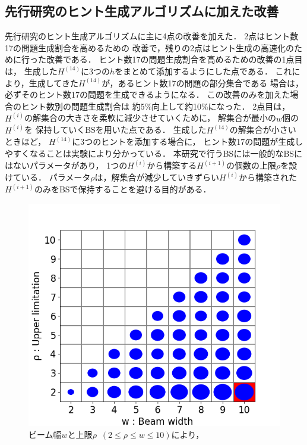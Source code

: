 \documentclass[a4paper, 9pt]{jarticle}
\begin{document}
\begin{論文概要}
\section{先行研究のヒント生成アルゴリズムに加えた改善}
先行研究のヒント生成アルゴリズムに主に4点の改善を加えた．
2点はヒント数17の問題生成割合を高めるための
改善で，残りの2点はヒント生成の高速化のために行った改善である．
ヒント数17の問題生成割合を高めるための改善の1点目は，
生成した$H^{(14)}$に3つの$h$をまとめて添加するようにした点である．
これにより，生成してきた$H^{(14)}$が，あるヒント数17の問題の部分集合である
場合は，必ずそのヒント数17の問題を生成できるようになる．
この改善のみを加えた場合のヒント数別の問題生成割合は
約5\%向上して約10\%になった．
2点目は，$H^{(i)}$の解集合の大きさを柔軟に減少させていくために，
解集合が最小の$w$個の$H^{(i)}$を
保持していくBSを用いた点である．
生成した$H^{(14)}$の解集合が小さいときほど，
$H^{(14)}$に3つのヒントを添加する場合に，
ヒント数17の問題が生成しやすくなることは実験により分かっている．
本研究で行うBSには一般的なBSにはないパラメータがあり，
1つの$H^{(i)}$から構築する$H^{(i+1)}$の個数の上限$\rho$を設けている．
パラメータ$\rho$は，解集合が減少していきずらい$H^{(i)}$から構築された
$H^{(i+1)}$のみをBSで保持することを避ける目的がある．
\begin{figure}[bt]
  \vspace{-3mm}
  \centering
  \includegraphics[keepaspectratio, scale=0.4]{best_beam_width_and_rho.png}
  \caption{ビーム幅$w$と上限$\rho$~$(2 \leq \rho \leq w \leq 10)$により，
}
\end{figure}
\end{論文概要}
\end{document}
